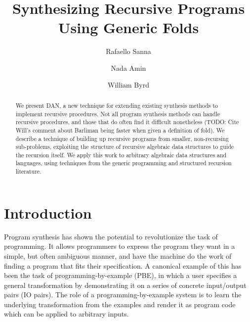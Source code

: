 \documentclass[acmsmall]{acmart}
\begin{document}
\title{Synthesizing Recursive Programs Using Generic Folds}

\author{Rafaello Sanna}
\author{Nada Amin}
\author{William Byrd}

\renewcommand{\shortauthors}{Raffi Sanna, Nada Amin and Will Byrd}

\renewcommand\footnotetextcopyrightpermission[1]{}
\pagestyle{fancy}
\fancyfoot{}
\makeatletter
\let\@authorsaddresses\@empty
\makeatother

\begin{abstract}
    We present DAN, a new technique for extending existing synthesis methods to implement recursive procedures. Not all program synthesis methods can handle recursive procedures, and those that do often find it difficult nonetheless (TODO: Cite Will's comment about Barliman being faster when given a definition of fold). We describe a technique of building up recursive programs from smaller, non-recursing sub-problems, exploiting the structure of recursive algebraic data structures to guide the recursion itself. We apply this work to arbitrary algebraic data structures and languages, using techniques from the generic programming and structured recursion literature.
\end{abstract}


\maketitle
\thispagestyle{firstfancy}

\section{Introduction}

Program synthesis has shown the potential to revolutionize the task of programming. It allows programmers to express the program they want in a simple, but often ambiguous manner, and have the machine do the work of finding a program that fits their specification. A canonical example of this has been the task of programming-by-example (PBE), in which a user specifies a general transformation by demonstrating it on a series of concrete input/output pairs (IO pairs). The role of a programming-by-example system is to learn the underlying transformation from the examples and render it as program code which can be applied to arbitrary inputs.
\end{document}
